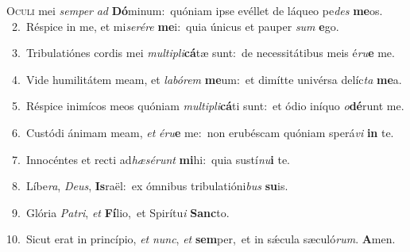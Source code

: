 \lettrine{\initial\textcolor{\initialcolor}{O}}{culi} mei \textit{sem}\-\textit{per} \textit{ad} \textbf{Dó}\-minum:~\star quóniam ipse evéllet de láqueo pe\textit{des} \textbf{me}\-os.\\
{\numbfont\textcolor{\numbcolor}{~2.}}~Réspice in me, et mi\-\textit{se}\-\textit{ré}\textit{re} \textbf{me}\-i:~\star quia únicus et pauper \textit{sum} \textbf{e}\-go.\par
{\numbfont\textcolor{\numbcolor}{~3.}}~Tribulatiónes cordis mei \textit{mul}\-\textit{ti}\textit{pli}\textbf{cá}tæ sunt:~\star de necessitátibus meis é\-\textit{ru}\-\textbf{e} me.\par
{\numbfont\textcolor{\numbcolor}{~4.}}~Vide humilitátem meam, et \textit{la}\-\textit{bó}\textit{rem} \textbf{me}\-um:~\star et dimítte univérsa delíc\textit{ta} \textbf{me}\-a.\par
{\numbfont\textcolor{\numbcolor}{~5.}}~Réspice inimícos meos quóniam \textit{mul}\-\textit{ti}\textit{pli}\textbf{cá}ti sunt:~\star et ódio iníquo \textit{o}\-\textbf{dé}runt me.\par
{\numbfont\textcolor{\numbcolor}{~6.}}~Custódi ánimam meam, \textit{et} \textit{é}\-\textit{ru}\textbf{e} me:~\star non erubéscam quóniam sperá\textit{vi} \textbf{in} te.\par
{\numbfont\textcolor{\numbcolor}{~7.}}~Innocéntes et recti ad\-\textit{hæ}\-\textit{sé}\textit{runt} \textbf{mi}\-hi:~\star quia sustí\-\textit{nu}\-\textbf{i} te.\par
{\numbfont\textcolor{\numbcolor}{~8.}}~Líbe\-\textit{ra}\-, \textit{De}\-\textit{us}, \textbf{Is}\-raël:~\star ex ómnibus tribulatióni\textit{bus} \textbf{su}\-is.\par
{\numbfont\textcolor{\numbcolor}{~9.}}~Glória \textit{Pa}\-\textit{tri}, \textit{et} \textbf{Fí}\-lio,~\star et Spirítu\textit{i} \textbf{Sanc}\-to.\par
{\numbfont\textcolor{\numbcolor}{10.}}~Sicut erat in princípio, \textit{et} \textit{nunc}\-, \textit{et} \textbf{sem}\-per,~\star et in sǽcula sæculó\-\textit{rum}\-. \textbf{A}\-men.\par
